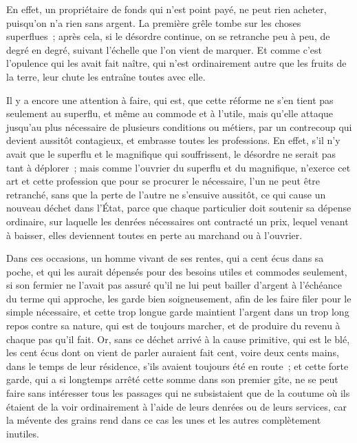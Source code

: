 \documentclass[french,twoside]{book} %
\begin{document}
En effet, un propriétaire de fonds qui n’est point payé, ne peut rien acheter, puisqu’on n’a rien sans argent. La première grêle tombe sur les choses superflues ; après cela, si le désordre continue, on se retranche peu à peu, de degré en degré, suivant l’échelle que l’on vient de marquer. Et comme c’est l’opulence qui les avait fait naître, qui n’est ordinairement autre que les fruits de la terre, leur chute les entraîne toutes avec elle.\par
Il y a encore une attention à faire, qui est, que cette réforme ne s’en tient pas seulement au superflu, et même au commode et à l’utile, mais qu’elle attaque jusqu’au plus nécessaire de plusieurs conditions ou métiers, par un contrecoup qui devient aussitôt contagieux, et embrasse toutes les professions. En effet, s’il n’y avait que le superflu et le magnifique qui souffrissent, le désordre ne serait pas tant à déplorer ; mais comme l’ouvrier du superflu et du magnifique, n’exerce cet art et cette profession que pour se procurer le nécessaire, l’un ne peut être retranché, sans que la perte de l’autre ne s’ensuive aussitôt, ce qui cause un nouveau déchet dans l’État, parce que chaque particulier doit soutenir sa dépense ordinaire, sur laquelle les denrées nécessaires ont contracté un prix, lequel venant à baisser, elles deviennent toutes en perte au marchand ou à l’ouvrier.\par
Dans ces occasions, un homme vivant de ses rentes, qui a cent écus dans sa poche, et qui les aurait dépensés pour des besoins utiles et commodes seulement, si son fermier ne l’avait pas assuré qu’il ne lui peut bailler d’argent à l’échéance du terme qui approche, les garde bien soigneusement, afin de les faire filer pour le simple nécessaire, et cette trop longue garde maintient l’argent dans un trop long repos contre sa nature, qui est de toujours marcher, et de produire du revenu à chaque pas qu’il fait. Or, sans ce déchet arrivé à la cause primitive, qui est le blé, les cent écus dont on vient de parler auraient fait cent, voire deux cents mains, dans le temps de leur résidence, s’ils avaient toujours été en route ; et cette forte garde, qui a si longtemps arrêté cette somme dans son premier gîte, ne se peut faire sans intéresser tous les passages qui ne subsistaient que de la coutume où ils étaient de la voir ordinairement à l’aide de leurs denrées ou de leurs services, car la mévente des grains rend dans ce cas les unes et les autres complètement inutiles.\par
\end{document}
